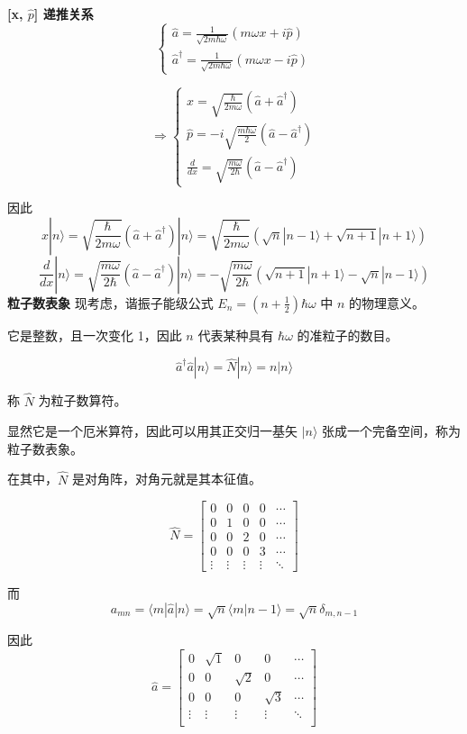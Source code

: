 \documentclass[lang=cn,10pt]{elegantbook}
\begin{document}
\textbf{[x, \(\hat{p}\)] 递推关系}
\[
\left\{
	\begin{array}{l}
		\hat{a} = \frac{1}{\sqrt{2m\hbar\omega}} (m \omega x + i \hat{p}) \\
		\hat{a}^\dagger = \frac{1}{\sqrt{2m\hbar\omega}} (m \omega x - i \hat{p})
	\end{array}
\right.
\]

\[
\Rightarrow
\left\{
\begin{array}{l}
	x = \sqrt{\frac{\hbar}{2m\omega}} (\hat{a} + \hat{a}^\dagger) \\
	\hat{p} = -i \sqrt{\frac{m \hbar \omega}{2}} (\hat{a} - \hat{a}^\dagger) \\
	\frac{d}{dx} = \sqrt{\frac{m\omega}{2\hbar}} (\hat{a} - \hat{a}^\dagger)
\end{array}
\right.
\]

因此
\[
x |n\rangle = \sqrt{\frac{\hbar}{2m\omega}} (\hat{a} + \hat{a}^\dagger) |n\rangle = \sqrt{\frac{\hbar}{2m\omega}} (\sqrt{n} |n-1\rangle + \sqrt{n+1} |n+1\rangle)
\]
\[
\frac{d}{dx} |n\rangle = \sqrt{\frac{m\omega}{2\hbar}} (\hat{a} - \hat{a}^\dagger) |n\rangle =- \sqrt{\frac{m\omega}{2\hbar}} (\sqrt{n+1} |n+1\rangle - \sqrt{n} |n-1\rangle)
\]
\textbf{粒子数表象}
现考虑，谐振子能级公式 \( E_n = \left(n + \frac{1}{2}\right) \hbar \omega \) 中 \( n \) 的物理意义。

它是整数，且一次变化 1，因此 \( n \) 代表某种具有 \( \hbar \omega \) 的准粒子的数目。

\[
\hat{a}^\dagger \hat{a} |n\rangle = \hat{N} |n\rangle = n |n\rangle
\]

称 \( \hat{N} \) 为粒子数算符。

显然它是一个厄米算符，因此可以用其正交归一基矢 \( |n\rangle \) 张成一个完备空间，称为粒子数表象。

在其中，\( \hat{N} \) 是对角阵，对角元就是其本征值。

\[
\hat{N} = \begin{bmatrix}
	0 & 0 & 0 & 0 & \cdots \\
	0 & 1 & 0 & 0 & \cdots \\
	0 & 0 & 2 & 0 & \cdots \\
	0 & 0 & 0 & 3 & \cdots \\
	\vdots & \vdots & \vdots & \vdots & \ddots
\end{bmatrix}
\]

而
\[
a_{mn} = \langle m | \hat{a} | n \rangle = \sqrt{n} \langle m | n-1 \rangle = \sqrt{n} \delta_{m, n-1}
\]

因此
\[
\hat{a} = \begin{bmatrix}
	0 & \sqrt{1} & 0 & 0 & \cdots \\
	0 & 0 & \sqrt{2} & 0 & \cdots \\
	0 & 0 & 0 & \sqrt{3} & \cdots \\
	\vdots & \vdots & \vdots & \vdots & \ddots \\
\end{bmatrix}
\]
\end{document}
